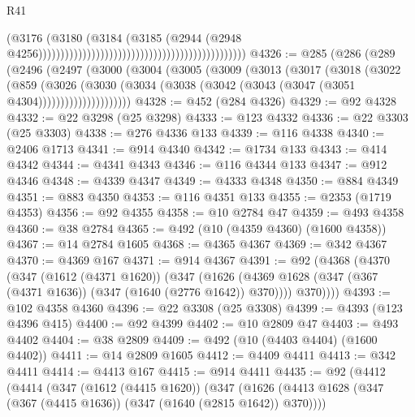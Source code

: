 \begin{lexlean}{R41}
\begin{coremodule}
                                                                                      (@3176
                                                                                        (@3180
                                                                                          (@3184
                                                                                            (@3185
                                                                                              (@2944
                                                                                                (@2948
                                                                                                  @4256)))))))))))))))))))))))))))))))))))))))))))))))
@4326 := @285
    (@286
      (@289
        (@2496
          (@2497
            (@3000
              (@3004
                (@3005
                  (@3009
                    (@3013
                      (@3017
                        (@3018
                          (@3022
                            (@859
                              (@3026
                                (@3030
                                  (@3034
                                    (@3038 (@3042 (@3043 (@3047 (@3051 @4304)))))))))))))))))))))
@4328 := @452 (@284 @4326)
@4329 := @92 @4328
@4332 := @22 @3298 (@25 @3298)
@4333 := @123 @4332
@4336 := @22 @3303 (@25 @3303)
@4338 := @276 @4336 @133
@4339 := @116 @4338
@4340 := @2406 @1713
@4341 := @914 @4340
@4342 := @1734 @133
@4343 := @414 @4342
@4344 := @4341 @4343
@4346 := @116 @4344 @133
@4347 := @912 @4346
@4348 := @4339 @4347
@4349 := @4333 @4348
@4350 := @884 @4349
@4351 := @883 @4350
@4353 := @116 @4351 @133
@4355 := @2353 (@1719 @4353)
@4356 := @92 @4355
@4358 := @10 @2784 @47
@4359 := @493 @4358
@4360 := @38 @2784
@4365 := @492 (@10 (@4359 @4360) (@1600 @4358))
@4367 := @14 @2784 @1605
@4368 := @4365 @4367
@4369 := @342 @4367
@4370 := @4369 @167
@4371 := @914 @4367
@4391 := @92
    (@4368
      (@4370
        (@347
          (@1612 (@4371 @1620))
          (@347
            (@1626 (@4369 @1628 (@347 (@367 (@4371 @1636)) (@347 (@1640 (@2776 @1642)) @370))))
            @370))))
@4393 := @102 @4358 @4360
@4396 := @22 @3308 (@25 @3308)
@4399 := @4393 (@123 @4396 @415)
@4400 := @92 @4399
@4402 := @10 @2809 @47
@4403 := @493 @4402
@4404 := @38 @2809
@4409 := @492 (@10 (@4403 @4404) (@1600 @4402))
@4411 := @14 @2809 @1605
@4412 := @4409 @4411
@4413 := @342 @4411
@4414 := @4413 @167
@4415 := @914 @4411
@4435 := @92
    (@4412
      (@4414
        (@347
          (@1612 (@4415 @1620))
          (@347
            (@1626 (@4413 @1628 (@347 (@367 (@4415 @1636)) (@347 (@1640 (@2815 @1642)) @370))))

\end{coremodule}
\end{lexlean}
